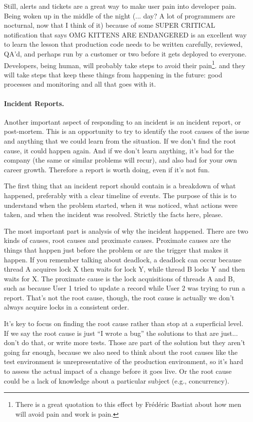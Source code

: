 Still, alerts and tickets are a great way to make user pain into developer pain. Being woken up in the middle of the night (... day? A lot of programmers are nocturnal, now that I think of it) because of some SUPER CRITICAL notification that says OMG KITTENS ARE ENDANGERED is an excellent way to learn the lesson that production code needs to be written carefully, reviewed, QA'd, and perhaps run by a customer or two before it gets deployed to everyone. Developers, being human, will probably take steps to avoid their pain\footnote{There is a great quotation to this effect by Fr\'ed\'eric Bastiat about how men will avoid pain and work is pain.}. and they will take steps that keep these things from happening in the future: good processes and monitoring and all that goes with it.

\paragraph{Incident Reports.} 
Another important aspect of responding to an incident is an incident report, or post-mortem. This is an opportunity to try to identify the root causes of the issue and anything that we could learn from the situation.  If we don't find the root cause, it could happen again. And if we don't learn anything, it's bad for the company (the same or similar problems will recur), and also bad for your own career growth. Therefore a report is worth doing, even if it's not fun.

The first thing that an incident report should contain is a breakdown of what happened, preferably with a clear timeline of events. The purpose of this is to understand when the problem started, when it was noticed, what actions were taken, and when the incident was resolved. Strictly the facts here, please.

The most important part is analysis of why the incident happened. There are two kinds of causes, root causes and proximate causes. Proximate causes are the things that happen just before the problem or are the trigger that makes it happen. If you remember talking about deadlock, a deadlock can occur because thread A acquires lock X then waits for lock Y, while thread B locks Y and then waits for X. The proximate cause is the lock acquisitions of threads A and B, such as because User 1 tried to update a record while User 2 was trying to run a report. That's not the root cause, though, the root cause is actually we don't always acquire locks in a consistent order.

It's key to focus on finding the root cause rather than stop at a superficial level. If we say the root cause is just ``I wrote a bug'' the solutions to that are just... don't do that, or write more tests. Those are part of the solution but they aren't going far enough, because we also need to think about the root causes like the test environment is unrepresentative of the production environment, so it's hard to assess the actual impact of a change before it goes live. Or the root cause could be a lack of knowledge about a particular subject (e.g., concurrency). 

